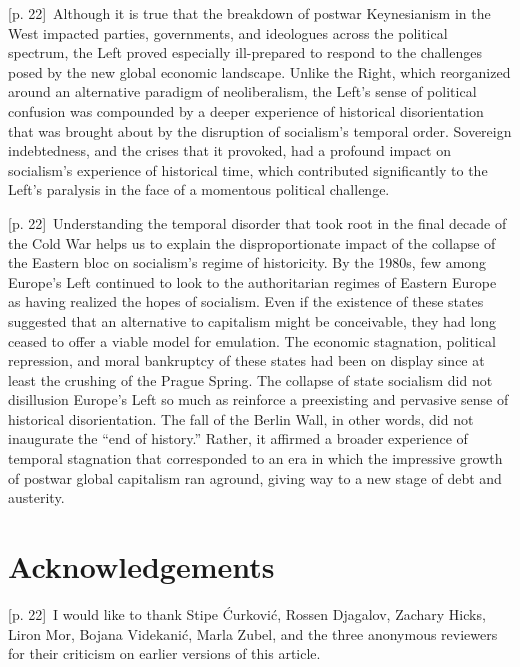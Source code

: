 \documentclass[10pt,a4paper]{article}
\begin{document}
{\scriptsize\color{gray} [p. 22]}\ Although it is true that the breakdown of postwar Keynesianism in the West impacted parties, governments, and ideologues across the political spectrum, the Left proved especially ill-prepared to respond to the challenges posed by the new global economic landscape. Unlike the Right, which reorganized around an alternative paradigm of neoliberalism, the Left’s sense of political confusion was compounded by a deeper experience of historical disorientation that was brought about by the disruption of socialism’s temporal order. Sovereign indebtedness, and the crises that it provoked, had a profound impact on socialism’s experience of historical time, which contributed significantly to the Left’s paralysis in the face of a momentous political challenge.\par
{\scriptsize\color{gray} [p. 22]}\ Understanding the temporal disorder that took root in the final decade of the Cold War helps us to explain the disproportionate impact of the collapse of the Eastern bloc on socialism’s regime of historicity. By the 1980s, few among Europe’s Left continued to look to the authoritarian regimes of Eastern Europe as having realized the hopes of socialism. Even if the existence of these states suggested that an alternative to capitalism might be conceivable, they had long ceased to offer a viable model for emulation. The economic stagnation, political repression, and moral bankruptcy of these states had been on display since at least the crushing of the Prague Spring. The collapse of state socialism did not disillusion Europe’s Left so much as reinforce a preexisting and pervasive sense of historical disorientation. The fall of the Berlin Wall, in other words, did not inaugurate the “end of history.” Rather, it affirmed a broader experience of temporal stagnation that corresponded to an era in which the impressive growth of postwar global capitalism ran aground, giving way to a new stage of debt and austerity.\par
{}\section*{Acknowledgements}
{\scriptsize\color{gray} [p. 22]}\ I would like to thank Stipe Ćurković, Rossen Djagalov, Zachary Hicks, Liron Mor, Bojana Videkanić, Marla Zubel, and the three anonymous reviewers for their criticism on earlier versions of this article.\par
\end{document}

